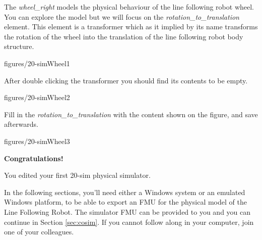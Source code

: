 \documentclass[11pt,a4paper]{../tutorial}
\begin{document}
\begin{instructions}
\item The \emph{wheel\_right} models the physical behaviour of the line
	following robot wheel. You can explore the model but we will focus on
	the \emph{rotation\_to\_translation} element. This element is a
	transformer which as it implied by its name transforms the rotation of
	the wheel into the translation of the line following robot body
	structure.  

    \begin{annotation}[width=0.8\linewidth]{figures/20-simWheel1}
    \end{annotation}

\item After double clicking the transformer you should find its contents to be empty.

    \begin{annotation}[width=0.7\linewidth]{figures/20-simWheel2}
    \end{annotation}

\newpage

\item Fill in the \emph{rotation\_to\_translation} with the content shown on the figure, and save afterwards.

    \begin{annotation}[width=0.8\linewidth]{figures/20-simWheel3}
	    
    \end{annotation}

\end{instructions}

\bigskip
\bigskip
{\large\bfseries Congratulations!}

You edited your first 20-sim physical simulator.

In the following sections, you'll need either a Windows system or an emulated Windows platform, to be
able to export an FMU for the physical model of the Line Following Robot. The
simulator FMU can be provided to you and you can continue in Section
\ref{sec:cosim}. If you cannot follow along in your computer, join one of your colleagues.
\end{document}
